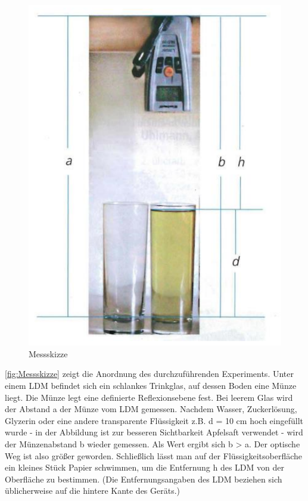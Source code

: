 \documentclass[11pt,ngerman]{scrartcl}
\begin{document}
\begin{figure}
        \centering
        \includegraphics[width=0.9\linewidth]{pics/Messskizze.png}
        \caption{Messskizze}%
        \label{fig:Messskizze}
        \vspace{-2.5cm}
\end{figure}
\autoref{fig:Messskizze} zeigt die Anordnung des durchzuführenden Experiments. Unter einem LDM
befindet sich ein schlankes Trinkglas, auf dessen Boden eine Münze liegt. Die
Münze legt eine definierte Reflexionsebene fest. Bei leerem Glas wird der
Abstand a der Münze vom LDM gemessen. Nachdem Wasser, Zuckerlösung, Glyzerin
oder eine andere transparente Flüssigkeit z.B. d = 10 cm hoch eingefüllt wurde
- in der Abbildung ist zur besseren Sichtbarkeit Apfelsaft verwendet - wird der
Münzenabstand b wieder gemessen. Als Wert ergibt sich b > a. Der optische Weg
ist also größer geworden. Schließlich lässt man auf der Flüssigkeitsoberfläche
ein kleines Stück Papier schwimmen, um die Entfernung h des LDM von der
Oberfläche zu bestimmen. (Die Entfernungsangaben des LDM beziehen sich
üblicherweise auf die hintere Kante des Geräts.)
\end{document}
